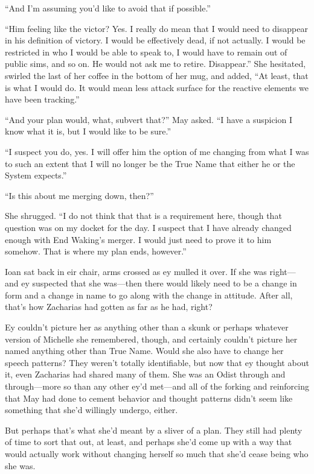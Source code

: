``And I'm assuming you'd like to avoid that if possible.''

``Him feeling like the victor? Yes. I really do mean that I would need to disappear in his definition of victory. I would be effectively dead, if not actually. I would be restricted in who I would be able to speak to, I would have to remain out of public sims, and so on. He would not ask me to retire. Disappear.'' She hesitated, swirled the last of her coffee in the bottom of her mug, and added, ``At least, that is what I would do. It would mean less attack surface for the reactive elements we have been tracking.''

``And your plan would, what, subvert that?'' May asked. ``I have a suspicion I know what it is, but I would like to be sure.''

``I suspect you do, yes. I will offer him the option of me changing from what I was to such an extent that I will no longer be the True Name that either he or the System expects.''

``Is this about me merging down, then?''

She shrugged. ``I do not think that that is a requirement here, though that question was on my docket for the day. I suspect that I have already changed enough with End Waking's merger. I would just need to prove it to him somehow. That is where my plan ends, however.''

Ioan sat back in eir chair, arms crossed as ey mulled it over. If she was right—and ey suspected that she was—then there would likely need to be a change in form and a change in name to go along with the change in attitude. After all, that's how Zacharias had gotten as far as he had, right?

Ey couldn't picture her as anything other than a skunk or perhaps whatever version of Michelle she remembered, though, and certainly couldn't picture her named anything other than True Name. Would she also have to change her speech patterns? They weren't totally identifiable, but now that ey thought about it, even Zacharias had shared many of them. She was an Odist through and through—more so than any other ey'd met—and all of the forking and reinforcing that May had done to cement behavior and thought patterns didn't seem like something that she'd willingly undergo, either.

But perhaps that's what she'd meant by a sliver of a plan. They still had plenty of time to sort that out, at least, and perhaps she'd come up with a way that would actually work without changing herself so much that she'd cease being who she was.

